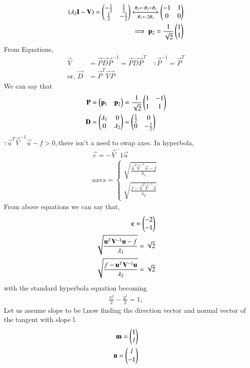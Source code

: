 \begin{align}
\left(\lambda_2\mathbf{I}-\mathbf{V}\right)
= \begin{pmatrix}-\frac{1}{2} & \frac{1}{2}
\\ \frac{1}{2} & -\frac{1}{2}\end{pmatrix} 
\xleftrightarrow[R_1 \leftarrow 2R_1] {R_2\leftarrow R_2+R_1}\begin{pmatrix}-1 & 1 \\0 & 0 \end{pmatrix}  
\\
\implies \mathbf{p}_2 = \frac{1}{\sqrt{2}}\begin{pmatrix}1 \\ 1\end{pmatrix}
\end{align}
From Equations,
\begin{align}
\vec{V} &= \vec{P}\vec{D}\vec{P}^{-1}=\vec{P}\vec{D}\vec{P}^T \quad \because \vec{P}^{-1} = \vec{P}^{T}
\\
\text{or, } \vec{D} &= \vec{P}^T\vec{V}\vec{P}
\end{align}
We can say that
\begin{align}
\mathbf{P} & =\begin{pmatrix}\mathbf{p}_1 & \mathbf{p}_2\end{pmatrix} = \frac{1}{\sqrt{2}}\begin{pmatrix}1 & -1\\ 1 & 1\end{pmatrix}\\
 \mathbf{D} &= \begin{pmatrix}\lambda_1 & 0 \\ 0 & \lambda_2\end{pmatrix} =\begin{pmatrix}\frac{1}{2} & 0\\ 0 & -\frac{1}{2}\end{pmatrix}
\end{align}
$\because \vec{u}^T\vec{V}^{-1}\vec{u}-f > 0 ,$there isn't a need to swap axes.
In hyperbola,
\begin{align}
\vec{c}=-\vec{V}^-1\vec{u}\\
axes=
\begin{cases}
\sqrt{\frac{\vec{u}^T\vec{V}^{-1}\vec{u}-f}{\lambda_1}}\\ \sqrt{\frac{f-\vec{u}^T\vec{V}^{-1}\vec{u}}{\lambda_2}}
\end{cases}
\end{align}
From above equations we can say that,
\begin{align}
\mathbf{c}=\begin{pmatrix}-2\\-1\end{pmatrix}\\
\sqrt{\frac{\mathbf{u}^T\mathbf{V}^{-1}\mathbf{u}-f}{\lambda_1}}=\sqrt{2}\\
\sqrt{\frac{f-\mathbf{u}^T\mathbf{V}^{-1}\mathbf{u}}{\lambda_2}}=\sqrt{2}
\end{align}
with the standard hyperbola equation becoming
\begin{align}
\frac{x^2}{2}-\frac{y^2}{2} = 1,
\label{eq:solutions/12/2.0.30}
\end{align}
Let us assume slope to be l,now finding the direction vector and normal vector of the tangent with slope l.
\begin{align}
\mathbf{m}=\begin{pmatrix}1\\l\end{pmatrix}\label{eq:solutions/12/2.0.27}\\
\mathbf{n}=\begin{pmatrix}l\\-1\end{pmatrix}\label{eq:solutions/12/2.0.28}
\end{align}
